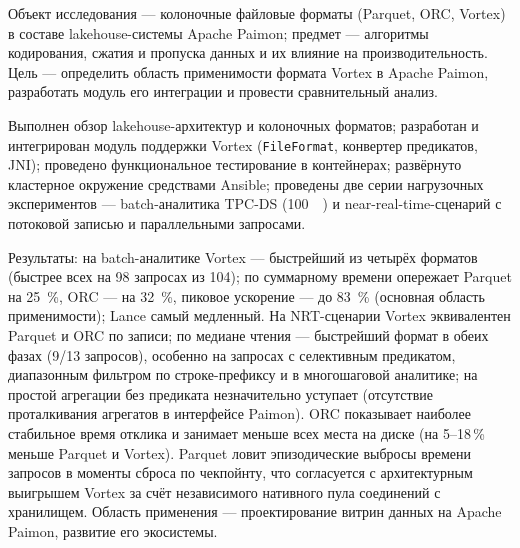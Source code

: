 \abstract %


Объект исследования --- колоночные файловые форматы (Parquet, ORC, Vortex) в
составе lakehouse-системы Apache Paimon; предмет --- алгоритмы кодирования,
сжатия и пропуска данных и их влияние на производительность. Цель --- определить
область применимости формата Vortex в Apache Paimon, разработать модуль его
интеграции и провести сравнительный анализ.

Выполнен обзор lakehouse-архитектур и колоночных форматов; разработан и
интегрирован модуль поддержки Vortex (\texttt{FileFormat}, конвертер предикатов,
JNI); проведено функциональное тестирование в контейнерах; развёрнуто кластерное
окружение средствами Ansible; проведены две серии нагрузочных экспериментов ---
batch-аналитика TPC-DS (\SI{100}{\giga\byte}) и near-real-time-сценарий с
потоковой записью и параллельными запросами.

Результаты: на batch-аналитике Vortex --- быстрейший из четырёх форматов
(быстрее всех на \num{98} запросах из \num{104}); по суммарному времени опережает
Parquet на \SI{25}{\percent}, ORC --- на \SI{32}{\percent}, пиковое ускорение ---
до \SI{83}{\percent} (основная область применимости); Lance самый медленный. На NRT-сценарии Vortex
эквивалентен Parquet и ORC по записи; по медиане чтения --- быстрейший формат в
обеих фазах (9/13 запросов), особенно на запросах с селективным предикатом,
диапазонным фильтром по строке-префиксу и в многошаговой аналитике; на простой
агрегации без предиката незначительно уступает (отсутствие проталкивания
агрегатов в интерфейсе Paimon). ORC показывает наиболее стабильное время отклика и занимает меньше всех места
на диске (на 5--18\,\% меньше Parquet и Vortex). Parquet ловит
эпизодические выбросы времени запросов в моменты сброса по чекпойнту, что
согласуется с архитектурным выигрышем Vortex за счёт независимого нативного
пула соединений с хранилищем. Область применения --- проектирование витрин данных
на Apache Paimon, развитие его экосистемы.
